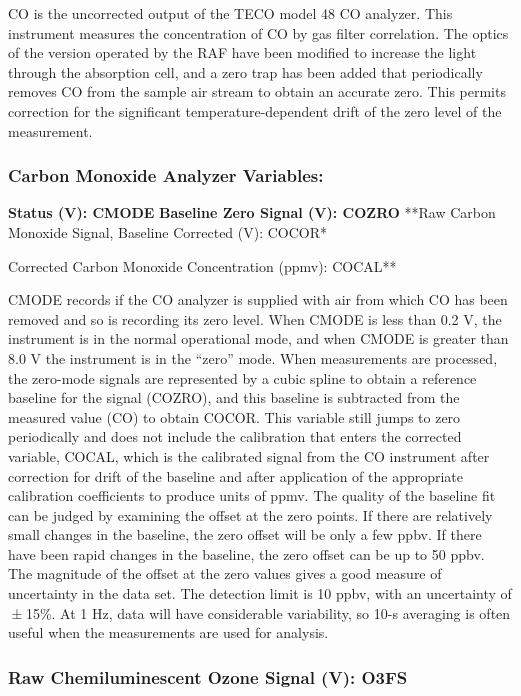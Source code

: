 \documentclass[
]{book}
\begin{document}
CO is the uncorrected output of the TECO model 48 CO analyzer. This instrument measures the concentration of CO by gas filter correlation. The optics of the version operated by the RAF have been modified to increase the light through the absorption cell, and a zero trap has been added that periodically removes CO from the sample air stream to obtain an accurate zero. This permits correction for the significant temperature-dependent drift of the zero level of the measurement.

\hypertarget{co-vars}{%
\subsubsection*{Carbon Monoxide Analyzer Variables:}\label{co-vars}}

\textbf{Status (V): CMODE}
\textbf{Baseline Zero Signal (V): COZRO}
**Raw Carbon Monoxide Signal, Baseline Corrected (V): COCOR*

\textbf{
}Corrected Carbon Monoxide Concentration (ppmv): COCAL**

CMODE records if the CO analyzer is supplied with air from which CO has been removed and so is recording its zero level. When CMODE is less than 0.2 V, the instrument is in the normal operational mode, and when CMODE is greater than 8.0 V the instrument is in the ``zero'' mode. When measurements are processed, the zero-mode signals are represented by a cubic spline to obtain a reference baseline for the signal (COZRO), and this baseline is subtracted from the measured value (CO) to obtain COCOR. This variable still jumps to zero periodically and does not include the calibration that enters the corrected variable, COCAL, which is the calibrated signal from the CO instrument after correction for drift of the baseline and after application of the appropriate calibration coefficients to produce units of ppmv. The quality of the baseline fit can be judged by examining the offset at the zero points. If there are relatively small changes in the baseline, the zero offset will be only a few ppbv. If there have been rapid changes in the baseline, the zero offset can be up to 50 ppbv. The magnitude of the offset at the zero values gives a good measure of uncertainty in the data set. The detection limit is 10 ppbv, with an uncertainty of { ± 15\%}. At 1 Hz, data will have considerable variability, so 10-s averaging is often useful when the measurements are used for analysis.

\hypertarget{o3fs}{%
\subsubsection*{Raw Chemiluminescent Ozone Signal (V): O3FS}\label{o3fs}}
\end{document}

